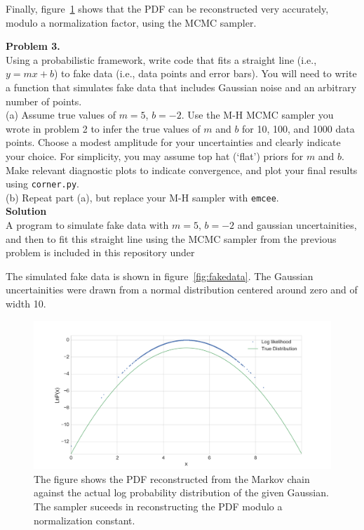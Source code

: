 \documentclass[12pt,usletter,english]{article}
\begin{document}
Finally, figure~\ref{fig:hist} shows that the PDF can be reconstructed
very accurately, modulo a normalization factor, using the MCMC
sampler.

\newpage

\noindent \textbf{Problem 3.} \\ 

\noindent Using a probabilistic framework, write code that fits a
straight line (i.e., $y=mx+b$) to fake data (i.e., data points and
error bars).  You will need to write a function that simulates fake
data that includes Gaussian noise and an arbitrary number of
points. \\

(a) Assume true values of $m=5$, $b=-2$. Use the M-H MCMC sampler you
wrote in problem 2 to infer the true values of $m$ and $b$ for 10,
100, and 1000 data points.  Choose a modest amplitude for your
uncertainties and clearly indicate your choice. For simplicity, you
may assume top hat (`flat') priors for $m$ and $b$. Make relevant
diagnostic plots to indicate convergence, and plot your final results
using \texttt{corner.py}. \\

(b) Repeat part (a), but replace your M-H sampler with
\texttt{emcee}. \\

\noindent \textbf{Solution}\\

A program to simulate fake data with $m=5$, $b=-2$ and gaussian
uncertainities, and then to fit this straight line using the MCMC
sampler from the previous problem is included in this repository under

The simulated fake data is shown in figure~\ref{fig:fakedata}. The
Gaussian uncertainities were drawn from a normal distribution centered
around zero and of width 10. 

\begin{figure}[!h]
  \centering \includegraphics[width=15cm]{dist_mcmc.png}
  \caption{The figure shows the PDF reconstructed from the Markov
    chain against the actual log probability distribution of the given
    Gaussian. The sampler suceeds in reconstructing the PDF modulo a
    normalization constant.
    \label{fig:hist}}
\end{figure}
\end{document}
